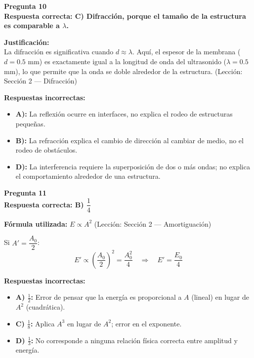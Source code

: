 \begin{respuestabox}
\textbf{Pregunta 10}\\
\textcolor{verdecorrecto}{\textbf{Respuesta correcta: C) Difracción, porque el tamaño de la estructura es comparable a $\lambda$.}}

\textbf{Justificación:}\\
La difracción es significativa cuando $d \approx \lambda$. Aquí, el espesor de la membrana ($d = 0.5$ mm) es exactamente igual a la longitud de onda del ultrasonido ($\lambda = 0.5$ mm), lo que permite que la onda se doble alrededor de la estructura. (Lección: Sección 2 — Difracción)

\textbf{Respuestas incorrectas:}
\begin{itemize}
    \item \textbf{A):} La reflexión ocurre en interfaces, no explica el rodeo de estructuras pequeñas.
    \item \textbf{B):} La refracción explica el cambio de dirección al cambiar de medio, no el rodeo de obstáculos.
    \item \textbf{D):} La interferencia requiere la superposición de dos o más ondas; no explica el comportamiento alrededor de una estructura.
\end{itemize}
\end{respuestabox}

\begin{respuestabox}
\textbf{Pregunta 11}\\
\textcolor{verdecorrecto}{\textbf{Respuesta correcta: B) $\dfrac{1}{4}$}}

\textbf{Fórmula utilizada:} $E \propto A^2$ (Lección: Sección 2 — Amortiguación)

Si $A' = \dfrac{A_0}{2}$:
$$E' \propto \left(\frac{A_0}{2}\right)^2 = \frac{A_0^2}{4} \quad \Rightarrow \quad E' = \frac{E_0}{4}$$

\textbf{Respuestas incorrectas:}
\begin{itemize}
    \item \textbf{A) $\frac{1}{2}$:} Error de pensar que la energía es proporcional a $A$ (lineal) en lugar de $A^2$ (cuadrática).
    \item \textbf{C) $\frac{1}{8}$:} Aplica $A^3$ en lugar de $A^2$; error en el exponente.
    \item \textbf{D) $\frac{1}{3}$:} No corresponde a ninguna relación física correcta entre amplitud y energía.
\end{itemize}
\end{respuestabox}

